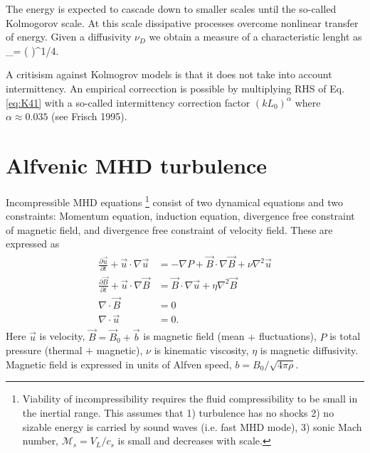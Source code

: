 \documentclass[usenatbib,twocolumn]{aastex63}
\begin{document}
The energy is expected to cascade down to smaller scales until the so-called Kolmogorov scale.
At this scale dissipative processes overcome nonlinear transfer of energy.
Given a diffusivity $\nu_D$ we obtain a measure of a characteristic lenght as
\be
\ell_\nu = \left(  \right)^{1/4}.
\ee

A critisism against Kolmogrov models is that it does not take into account intermittency.
An empirical correcction is possible by multiplying RHS of Eq. \eqref{eq:K41} with a so-called intermittency correction factor $(k L_0)^\alpha$ where $\alpha \approx 0.035$ (see Frisch 1995).


\section{Alfvenic MHD turbulence}\label{sect:mhd_theory}

Incompressible MHD equations%
\footnote{
    Viability of incompressibility requires the fluid compressibility to be small in the inertial range.
    This assumes that 
    1) turbulence has no shocks
    2) no sizable energy is carried by sound waves (i.e. fast MHD mode),
    3) sonic Mach number, $\mathcal{M}_s = V_L/c_s$ is small and decreases with scale.
}
consist of two dynamical equations and two constraints:
Momentum equation,
induction equation,
divergence free constraint of magnetic field,
and divergence free constraint of velocity field.
These are expressed as
\begin{align}\begin{split}
    \frac{\partial \vec{u}}{\partial t} + \vec{u} \cdot \nabla \vec{u} &= -\nabla P + \vec{B} \cdot \nabla \vec{B} + \nu \nabla^2 \vec{u} \\
    \frac{\partial \vec{B}}{\partial t} + \vec{u} \cdot \nabla \vec{B} &= \vec{B} \cdot \nabla \vec{u} + \eta \nabla^2 \vec{B} \\
    \nabla \cdot \vec{B} &= 0\\
    \nabla \cdot \vec{u} &= 0.
\end{split}\end{align}
Here $\vec{u}$ is velocity, $\vec{B} = \vec{B}_0 + \vec{b}$ is magnetic field (mean $+$ fluctuations), $P$ is total pressure (thermal $+$ magnetic), $\nu$ is kinematic viscosity, $\eta$ is magnetic diffusivity.
Magnetic field is expressed in units of Alfven speed, $b = B_0/\sqrt{4\pi \rho}$.
\end{document}
